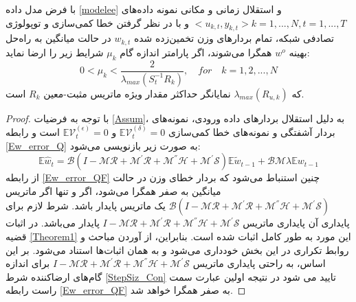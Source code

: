 \begin{theorem}\label{theoremQuantizarion}
	با فرض مدل داده \ref{modelee} و استقلال زمانی و مکانی نمونه داده‌های  $<u_{k,t},y_{k,t}>k=1,...,N, t=1,...,T$ و با در نظر گرفتن خطا کمی‌سازی و توپولوژی تصادفی شبکه، تمام بردارهای وزن تخمین‌زده‌ شده $w_{k,t}$ در حالت میانگین به راه‌حل بهینه $w^o$ همگرا می‌شوند، اگر پارامتر اندازه گام $\mu_k$ شرایط زیر را ارضا نماید:
	\begin{equation}\label{StepSiz_Con}
		0<\mu_k<\frac{2}{\lambda_{max}\left(S^{-1}_t R_{k}\right)},\quad for \quad k=1,2,...,N
	\end{equation}
که $\lambda_{max}\left(R_{u,k}\right)$ نمایانگر حداکثر مقدار ویژه ماتریس مثبت-معین $R_{k}$ است. 
\end{theorem}

\begin{proof}
 با توجه به فرضیات \ref{Assum}، به دلیل استقلال بردارهای داده ورودی، نمونه‌های بردار آشفتگی و نمونه‌های خطا کمی‌سازی $\mathbb{E}\mathcal{V}^{\left(\delta\right)}_t=0$ و $\mathbb{E}\mathcal{V}^{\left(\epsilon\right)}_t=0$ است و رابطه \ref{Ew_error_Q} به صورت زیر بازنویسی می‌شود:
\begin{equation}\label{Ew_error_QF}
	\mathbb{E}\hat{w}_t=\mathcal{B}(I-\mathcal{M}\mathcal{R}+\mathcal{M}^{'}\mathcal{R}+\mathcal{M}^{''}\mathcal{H}+\mathcal{M}^{'}\mathcal{S})\mathbb{E}\tilde{w}_{t-1}+\mathcal{B}\mathcal{M}\lambda \mathbb{E}w_{t-1}
\end{equation}
از رابطه \ref{Ew_error_QF} چنین استنباط می‌شود که بردار خطای وزن در حالت میانگین به صفر همگرا می‌شود، اگر و تنها  اگر ماتریس $\mathcal{B}(I-\mathcal{M}\mathcal{R}+\mathcal{M}^{'}\mathcal{R}+\mathcal{M}^{''}\mathcal{H}+\mathcal{M}^{'}\mathcal{S})$ یک ماتریس پایدار باشد. شرط لازم برای پایداری آن پایداری ماتریس $I-\mathcal{M}\mathcal{R}+\mathcal{M}^{'}\mathcal{R}+\mathcal{M}^{''}\mathcal{H}+\mathcal{M}^{'}\mathcal{S}$ پایدار می‌باشد. در اثبات قضیه \ref{Theorem1} این مورد به طور کامل اثبات شده است. بنابراین، از آوردن مباحث و روابط تکراری در این بخش خودداری می‌شود و به همان اثبات‌ها استناد می‌شود. بر این اساس، به راحتی پایداری ماتریس $I-\mathcal{M}\mathcal{R}+\mathcal{M}^{'}\mathcal{R}+\mathcal{M}^{''}\mathcal{H}+\mathcal{M}^{'}\mathcal{S}$ برای اندازه گام‌های ارضاکننده شرط \ref{StepSiz_Con} تایید می شود در نتیجه اولین عبارت سمت راست رابطه \ref{Ew_error_QF} به صفر همگرا خواهد شد.


\end{proof}
